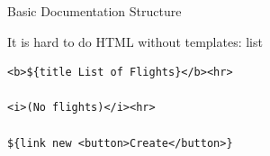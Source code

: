 \documentclass[aspectratio=43,handout,bigger]{beamer}
\begin{document}

\begin{frame}{Basic Documentation Structure}
\end{frame}


\begin{frame}[fragile]{It is hard to do HTML without templates: list}
\begin{verbatim}
<b>${title List of Flights}</b><hr>

<i>(No flights)</i><hr>

${link new <button>Create</button>}
\end{verbatim}
\end{frame}
\end{document}
